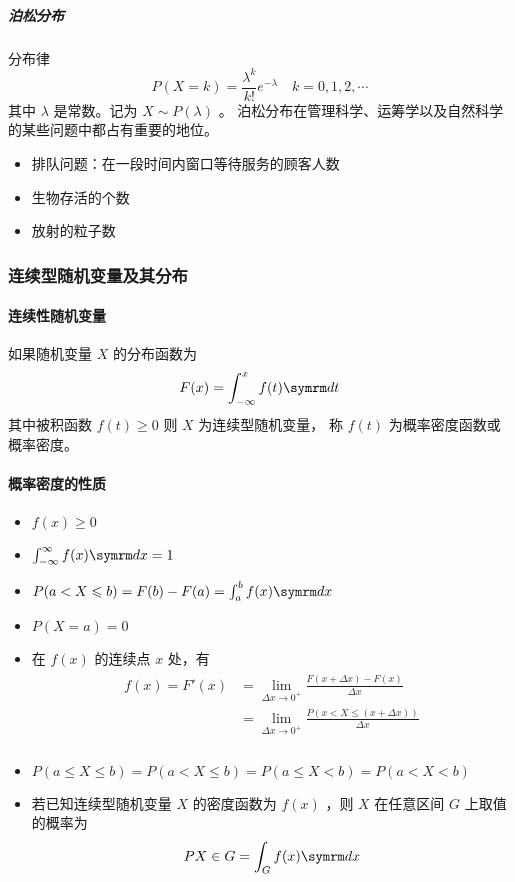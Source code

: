 \subparagraph{泊松分布}  分布律  $$ P(X=k) = \frac{\lambda^k}{k!}e^{-\lambda} \quad k = 0,1,2,\cdots $$ 
其中  $ \lambda $ 是常数。记为  $ X \sim P(\lambda) $ 。
泊松分布在管理科学、运筹学以及自然科学的某些问题中都占有重要的地位。 
\begin{itemize}[leftmargin=\subparitemindent]
    \item 排队问题：在一段时间内窗口等待服务的顾客人数
    \item 生物存活的个数
    \item 放射的粒子数
\end{itemize}

\subsubsection{连续型随机变量及其分布}

\paragraph{连续性随机变量} 如果随机变量 $ X $ 的分布函数为
$$ F(x) = \int_{-\infty}^x f(t)\diff t $$ 
其中被积函数 $ f(t) \geqslant 0 $ 则 $ X $ 为连续型随机变量，
称 $ f(t) $ 为概率密度函数或概率密度。

\paragraph{概率密度的性质}
\begin{itemize}[leftmargin=\paritemindent]
    \item  $ f(x) \geqslant 0 $ 
    \item  $ \int_{-\infty}^\infty f(x) \diff x = 1 $ 
    \item  $ P(a < X \leqslant b) = F(b) - F(a) = \int_a^b f(x) \diff x $
    \item  $ P(X = a) = 0 $ 
    \item 在 $ f(x) $ 的连续点 $ x $ 处，有\begin{align}
        \begin{split}
            f(x) = F'(x)
            & = \lim_{\Delta x \rightarrow 0^+} \frac{F(x + \Delta x) - F(x)}{\Delta x} \\
            & = \lim_{\Delta x \rightarrow 0^+} \frac{P(x < X \leqslant (x + \Delta x))}{\Delta x} \\
        \end{split}
    \end{align}
    \item  $ P(a \leqslant X \leqslant b) = P(a < X \leqslant b) = P(a \leqslant X < b) = P(a < X < b) $ 
    \item 若已知连续型随机变量 $ X $ 的密度函数为 $ f(x) $ ，则 $ X $ 在任意区间 $ G $ 上取值的概率为
    \begin{equation}
        P{X \in G} = \int_G f(x) \diff x
    \end{equation}
\end{itemize}

